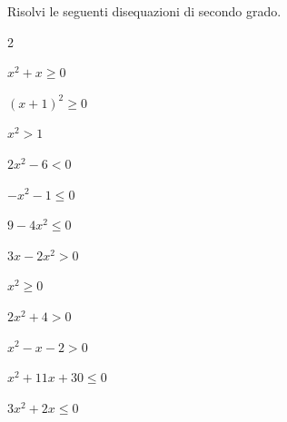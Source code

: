 \begin{esercizio}[*]
\label{ese:4.4}
Risolvi le seguenti disequazioni di secondo grado.

\begin{htmulticols}{2}
\begin{enumeratea}
\item \(x^2+x \geqslant 0\) 
\item \((x+1)^2 \geqslant 0\) \sol{\R}
\item \(x^2>1\) 
\item \(2x^2-6<0\) 
\item \(-x^2-1 \leqslant 0\) \sol{\R}
\item \(9-4x^2 \leqslant 0\) 
\item \(3x-2x^2>0\) 
\item \(x^2 \geqslant 0\) 
\item \(2x^2+4>0\) \sol{\R} 
\item \(x^2-x-2>0\)  
\item \(x^2+11x+30 \leqslant 0\) 
\item \(3x^2+2x \leqslant 0\) 
\end{enumeratea}
\end{htmulticols}
\end{esercizio}

